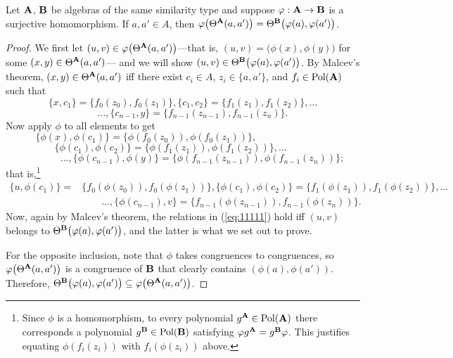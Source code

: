 \begin{lem}
  \label{lem:hom-cong}
  Let $\mathbf{A}$, $\mathbf{B}$ be algebras of the same similarity type and suppose
  $\varphi: \mathbf{A} \to \mathbf{B}$ is a surjective homomorphism.  If $a, a' \in A$, then
  $\varphi \bigl(\Theta^{\mathbf{A}}(a,a')\bigr) =\Theta^{\mathbf{B}}\bigl(\varphi (a),\varphi(a')\bigr)$.
\end{lem}
\begin{proof}
We first let $(u,v) \in \varphi \bigl(\Theta^{\mathbf{A}}(a,a')\bigr)$---that is,
$(u,v) = \bigl(\phi (x),\phi(y)\bigr)$ for some  $(x,y) \in \Theta^{\mathbf{A}}(a,a')$---
and we will show $(u,v) \in \Theta^{\mathbf{B}}\bigl(\varphi (a),\varphi(a')\bigr)$.
By Malcev's theorem, $(x,y) \in \Theta^{\mathbf{A}}(a,a')$ iff there exist
$c_i\in A$, $z_i \in \{a, a'\}$, and $f_i\in \operatorname{Pol}(\mathbf{A})$
such that
\[
\{x, c_1\} = \{f_0(z_0), f_0(z_1)\},
\{c_1, c_2\} = \{f_1(z_1), f_1(z_2)\},
\dots
\]
\[
\qquad \dots, \{c_{n-1}, y\} = \{f_{n-1}(z_{n-1}), f_{n-1}(z_n)\}.
\]
Now apply $\phi$ to all elements to get
\[
\{\phi(x), \phi(c_1)\} = \{\phi(f_0(z_0)), \phi(f_0(z_1))\}, \phantom{XXXXXXXXX}
\]
\[
\{\phi(c_1), \phi(c_2)\} = \{\phi(f_1(z_1)), \phi(f_1(z_2))\},\dots
 \phantom{XXX}
\]
\[
\qquad\qquad \dots,
\{\phi(c_{n-1}), \phi(y)\} = \{\phi(f_{n-1}(z_{n-1})), \phi(f_{n-1}(z_n))\};
\]
that is,\footnote{Since $\phi$ is a homomorphism, to every polynomial
$g^{\mathbf{A}} \in \operatorname{Pol}(\mathbf{A})$ there corresponds a polynomial
$g^{\mathbf{B}} \in \operatorname{Pol}(\mathbf{B})$ satisfying
$\varphi g^{\mathbf{A}} = g^{\mathbf{B}}\varphi$.  This justifies equating
$\phi(f_{i}(z_{i}))$ with $f_{i}(\phi(z_{i}))$ above.}
\begin{align}
  \label{eq:11111}
\{u, \phi(c_1)\} =& \{f_0(\phi(z_0)), f_0(\phi(z_1))\},
\{\phi(c_1), \phi(c_2)\} = \{f_1(\phi(z_1)), f_1(\phi(z_2))\},
\dots \nonumber\\
&\qquad \dots,
\{\phi(c_{n-1}), v\} = \{f_{n-1}(\phi(z_{n-1})), f_{n-1}(\phi(z_n))\}.
\end{align}
Now, again by Malcev's theorem, the relations in (\ref{eq:11111})
hold iff $(u,v)$ belongs to $\Theta^{\mathbf{B}}\bigl(\varphi (a),\varphi(a')\bigr)$,
and the latter is what we set out to prove.

For the opposite inclusion, note that $\phi$
takes congruences to congruences, so $\varphi \bigl(\Theta^{\mathbf{A}}(a,a')\bigr)$ is a congruence
of $\mathbf{B}$ that clearly contains $(\phi (a),\phi(a'))$. Therefore,
$\Theta^{\mathbf{B}}\bigl(\varphi (a),\varphi(a')\bigr) \subseteq \varphi \bigl(\Theta^{\mathbf{A}}(a,a')\bigr)$.
\end{proof}

